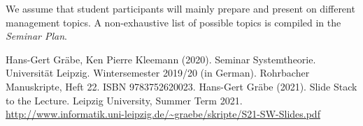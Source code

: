 \documentclass[11pt,a4paper]{article}
\begin{document}
We assume that student participants will mainly prepare and present on
different management topics. A non-exhaustive list of possible topics is
compiled in the \emph{Seminar Plan}.

\begin{thebibliography}{xxx}
 Hans-Gert Gräbe, Ken Pierre Kleemann (2020). Seminar
  Systemtheorie. Universität Leipzig. Wintersemester 2019/20 (in German).
  Rohrbacher Manuskripte, Heft 22. ISBN 9783752620023.
 Hans-Gert Gräbe (2021). Slide Stack to the Lecture.
  Leipzig University, Summer Term 2021.\\
  \url{http://www.informatik.uni-leipzig.de/~graebe/skripte/S21-SW-Slides.pdf}
\end{thebibliography}
\end{document}
